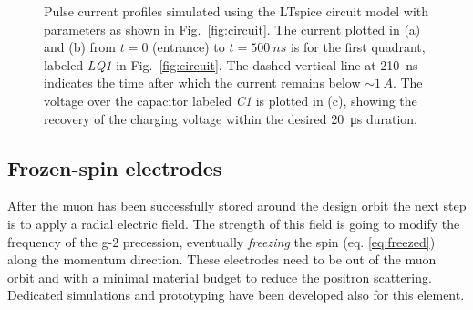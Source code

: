 \begin{refsection}
        
        \begin{figure}
        \centering
        \hfill
        \hfill
        \caption{Pulse current profiles simulated using the LTspice circuit model with parameters as shown in Fig.~\ref{fig:circuit}. The current plotted in (a) and (b) from $t=0$ (entrance) to $t=\SI{500}{ns}$ is for the first quadrant, labeled \textit{LQ1} in Fig.~\ref{fig:circuit}. The dashed vertical line at \SI{210}{ns} indicates the time after which the current remains below $\sim 1\,A$. The voltage over the capacitor labeled \textit{C1} is plotted in (c), showing the recovery of the charging voltage within the desired \SI{20}{\micro s} duration.}
        \label{fig:pulses}
        \end{figure}

    \subsection{Frozen-spin electrodes}
        After the muon has been successfully stored around the design orbit the next step is to apply a radial electric field. 
        The strength of this field is going to modify the frequency of the g-2 precession, eventually \textit{freezing} the spin (eq. \ref{eq:freezed}) along the momentum direction.
        These electrodes need to be out of the muon orbit and with a minimal material budget to reduce the positron scattering.  
        Dedicated simulations and prototyping have been developed also for this element.\\\\


\end{refsection}
